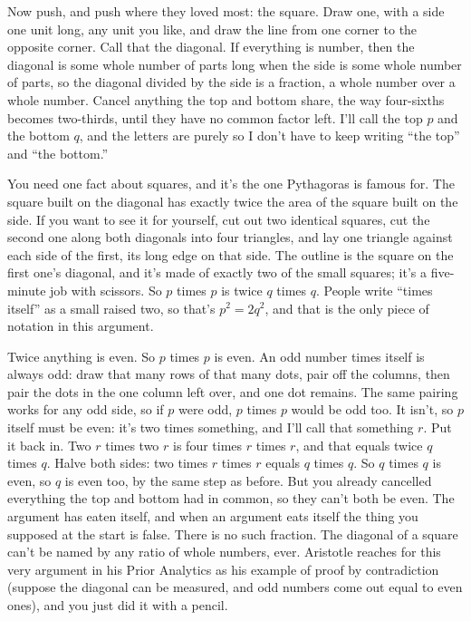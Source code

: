 \documentclass[11pt,twoside]{article}
\theoremstyle{thielethm}
\theoremstyle{thieledef}
\theoremstyle{thieledef}
\theoremstyle{thieledef}
\theoremstyle{thielethm}
\theoremstyle{thieleobs}
\theoremstyle{thielethm}
\begin{document}
Now push, and push where they loved most: the square. Draw one, with a side one unit long, any unit you like, and draw the line from one corner to the opposite corner. Call that the diagonal. If everything is number, then the diagonal is some whole number of parts long when the side is some whole number of parts, so the diagonal divided by the side is a fraction, a whole number over a whole number. Cancel anything the top and bottom share, the way four-sixths becomes two-thirds, until they have no common factor left. I'll call the top $p$ and the bottom $q$, and the letters are purely so I don't have to keep writing ``the top'' and ``the bottom.''

You need one fact about squares, and it's the one Pythagoras is famous for. The square built on the diagonal has exactly twice the area of the square built on the side. If you want to see it for yourself, cut out two identical squares, cut the second one along both diagonals into four triangles, and lay one triangle against each side of the first, its long edge on that side. The outline is the square on the first one's diagonal, and it's made of exactly two of the small squares; it's a five-minute job with scissors. So $p$ times $p$ is twice $q$ times $q$. People write ``times itself'' as a small raised two, so that's $p^2 = 2q^2$, and that is the only piece of notation in this argument.

Twice anything is even. So $p$ times $p$ is even. An odd number times itself is always odd: draw that many rows of that many dots, pair off the columns, then pair the dots in the one column left over, and one dot remains. The same pairing works for any odd side, so if $p$ were odd, $p$ times $p$ would be odd too. It isn't, so $p$ itself must be even: it's two times something, and I'll call that something $r$. Put it back in. Two $r$ times two $r$ is four times $r$ times $r$, and that equals twice $q$ times $q$. Halve both sides: two times $r$ times $r$ equals $q$ times $q$. So $q$ times $q$ is even, so $q$ is even too, by the same step as before. But you already cancelled everything the top and bottom had in common, so they can't both be even. The argument has eaten itself, and when an argument eats itself the thing you supposed at the start is false. There is no such fraction. The diagonal of a square can't be named by any ratio of whole numbers, ever. Aristotle reaches for this very argument in his Prior Analytics as his example of proof by contradiction (suppose the diagonal can be measured, and odd numbers come out equal to even ones), and you just did it with a pencil.
\end{document}
